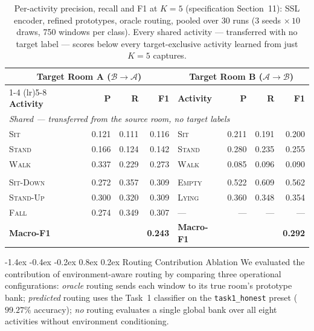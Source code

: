 \documentclass[10pt,a4paper]{article}
\makeatletter
\renewcommand{\subsection}{\@startsection{subsection}{2}{\z@}%
  {-1.4ex \@plus -0.4ex \@minus -0.2ex}%
  {0.8ex \@plus 0.2ex}%
  {\normalfont\normalsize\bfseries\color{secondary}}}
\makeatother
\begin{document}
\begin{table}[htbp]
\centering
\footnotesize
\setlength{\tabcolsep}{4pt}
\caption{Per-activity precision, recall and F1 at $K=5$ (specification Section~11): SSL encoder, refined prototypes, oracle routing, pooled over 30 runs ($3$ seeds $\times\,10$ draws, 750 windows per class). Every shared activity --- transferred with no target label --- scores below every target-exclusive activity learned from just $K=5$ captures.}
\label{tab:task3_per_activity}
\begin{tabular}{lrrr@{\hspace{1.6em}}lrrr}
\toprule
\multicolumn{4}{c}{\textbf{Target Room A} ($\mathcal{B} \to \mathcal{A}$)} & \multicolumn{4}{c}{\textbf{Target Room B} ($\mathcal{A} \to \mathcal{B}$)} \\
\cmidrule(lr){1-4} \cmidrule(lr){5-8}
\textbf{Activity} & \textbf{P} & \textbf{R} & \textbf{F1} & \textbf{Activity} & \textbf{P} & \textbf{R} & \textbf{F1} \\
\midrule
\multicolumn{8}{l}{\textit{Shared --- transferred from the source room, no target labels}} \\
\textsc{Sit}       & 0.121 & 0.111 & 0.116 & \textsc{Sit}    & 0.211 & 0.191 & 0.200 \\
\textsc{Stand}     & 0.166 & 0.124 & 0.142 & \textsc{Stand}  & 0.280 & 0.235 & 0.255 \\
\textsc{Walk}      & 0.337 & 0.229 & 0.273 & \textsc{Walk}   & 0.085 & 0.096 & 0.090 \\
\addlinespace[2pt]
\multicolumn{8}{l}{\textit{Target-exclusive --- learned from $K=5$ labelled captures}} \\
\textsc{Sit-Down}  & 0.272 & 0.357 & 0.309 & \textsc{Empty}  & 0.522 & 0.609 & 0.562 \\
\textsc{Stand-Up}  & 0.300 & 0.320 & 0.309 & \textsc{Lying}  & 0.360 & 0.348 & 0.354 \\
\textsc{Fall}      & 0.274 & 0.349 & 0.307 & ---             & ---   & ---   & --- \\
\midrule
\textbf{Macro-F1}  &       &       & \textbf{0.243} & \textbf{Macro-F1} & & & \textbf{0.292} \\
\bottomrule
\end{tabular}
\end{table}

\subsection{Routing Contribution Ablation}
We evaluated the contribution of environment-aware routing by comparing three operational configurations:
\emph{oracle} routing sends each window to its true room's prototype bank; \emph{predicted} routing uses the Task~1 classifier on the \texttt{task1\_honest} preset ($99.27\%$ accuracy); \emph{no} routing evaluates a single global bank over all eight activities without environment conditioning.
\end{document}
